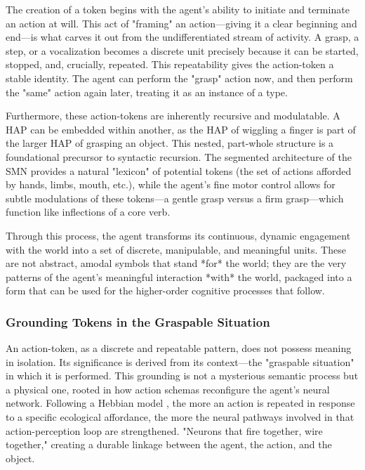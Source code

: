 The creation of a token begins with the agent's ability to initiate and terminate an action at will. This act of "framing" an action—giving it a clear beginning and end—is what carves it out from the undifferentiated stream of activity. A grasp, a step, or a vocalization becomes a discrete unit precisely because it can be started, stopped, and, crucially, repeated. This repeatability gives the action-token a stable identity. The agent can perform the "grasp" action now, and then perform the "same" action again later, treating it as an instance of a type.

Furthermore, these action-tokens are inherently recursive and modulatable. A HAP can be embedded within another, as the HAP of wiggling a finger is part of the larger HAP of grasping an object. This nested, part-whole structure is a foundational precursor to syntactic recursion. The segmented architecture of the SMN provides a natural "lexicon" of potential tokens (the set of actions afforded by hands, limbs, mouth, etc.), while the agent's fine motor control allows for subtle modulations of these tokens—a gentle grasp versus a firm grasp—which function like inflections of a core verb.

Through this process, the agent transforms its continuous, dynamic engagement with the world into a set of discrete, manipulable, and meaningful units. These are not abstract, amodal symbols that stand *for* the world; they are the very patterns of the agent's meaningful interaction *with* the world, packaged into a form that can be used for the higher-order cognitive processes that follow.

\subsubsection*{Grounding Tokens in the Graspable Situation}
An action-token, as a discrete and repeatable pattern, does not possess meaning in isolation. Its significance is derived from its context—the "graspable situation" in which it is performed. This grounding is not a mysterious semantic process but a physical one, rooted in how action schemas reconfigure the agent's neural network. Following a Hebbian model \cite{hebb1949organization}, the more an action is repeated in response to a specific ecological affordance, the more the neural pathways involved in that action-perception loop are strengthened. "Neurons that fire together, wire together," creating a durable linkage between the agent, the action, and the object.

